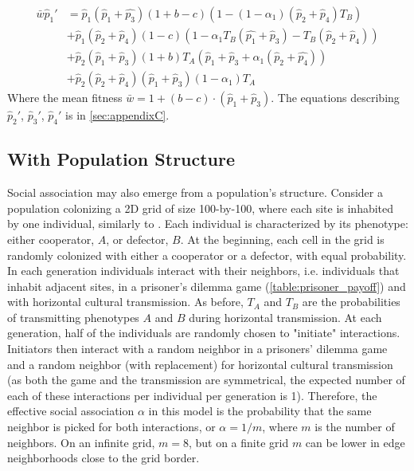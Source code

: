 \documentclass[12pt]{extarticle}
\begin{document}
{\begin{equation} \label{eq:next_gen_p_1}
  \begin{aligned}
  \bar{w}\hat{p}_1' & = \hat{p}_1(\hat{p}_1+\hat{p_3})(1+b-c)(1 - (1-\alpha_1)(\hat{p}_2 + \hat{p}_4)T_B) \\
  &+ \hat{p}_1(\hat{p}_2 + \hat{p}_4)(1-c)(1-\alpha_1T_B(\hat{p_1}+\hat{p}_3) - T_B(\hat{p}_2+\hat{p}_4)) \\
  &+ \hat{p}_2(\hat{p}_1 + \hat{p}_3)(1+b)T_A(\hat{p}_1 + \hat{p}_3 + \alpha_1(\hat{p}_2 + \hat{p_4})) \\
  &+ \hat{p}_2(\hat{p}_2 + \hat{p}_4)(\hat{p}_1 + \hat{p}_3)(1-\alpha_1)T_A 
  \end{aligned}
\end{equation}
Where the mean fitness $\bar{w} = 1 + (b-c)\cdot(\hat{p}_1 + \hat{p}_3)$. The equations describing $\hat{p}_2'$, $\hat{p}_3'$, $\hat{p}_4'$ is in \autoref{sec:appendixC}.

\subsection*{With Population Structure}

Social association may also emerge from a population's structure.
Consider a  population colonizing a 2D grid of size 100-by-100, where each site is inhabited by one individual, similarly to \citet{lewin2020rockpaperscissors}.
Each individual is characterized by its phenotype: either cooperator, $A$, or defector, $B$.
At the beginning, each cell in the grid is randomly colonized with either a cooperator or a defector, with equal probability.
In each generation individuals interact with their neighbors, i.e. individuals that inhabit adjacent sites, in a prisoner's dilemma game (\autoref{table:prisoner_payoff}) and with horizontal cultural transmission.
As before, $T_A$ and $T_B$ are the probabilities of transmitting phenotypes $A$ and $B$ during horizontal transmission.
At each generation, half of the individuals are randomly chosen to "initiate" interactions.
Initiators then interact with a random neighbor in a prisoners' dilemma game and a random neighbor (with replacement) for horizontal cultural transmission (as both the game and the transmission are symmetrical, the expected number of each of these interactions per individual per generation is 1).
Therefore, the effective social association $\alpha$ in this model is the probability that the same neighbor is picked for both interactions, or $\alpha=1/m$, where $m$ is the number of neighbors.
On an infinite grid, $m=8$, but on a finite grid $m$ can be lower in edge neighborhoods close to the grid border.

}
\end{document}
